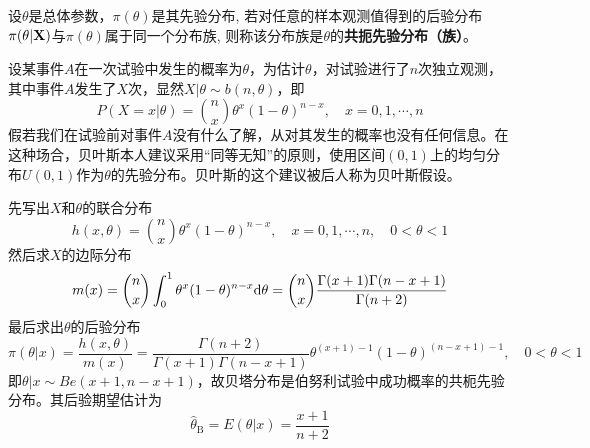 \begin{definition}[共扼先验分布]
    设$\theta$是总体参数，$\pi(\theta)$是其先验分布, 若对任意的样本观测值得到的后验分布$\pi(\theta|\bf{X})$与$\pi(\theta)$属于同一个分布族, 则称该分布族是$\theta$的\textbf{共扼先验分布（族）}。
\end{definition}

\begin{example}
    设某事件$A$在一次试验中发生的概率为$\theta$，为估计$\theta$，对试验进行了$n$次独立观测，其中事件$A$发生了$X$次，显然$X | \theta \sim b(n, \theta)$，即
    \[P(X=x | \theta)=\binom{n}{x} \theta^{x}(1-\theta)^{n-x}, \quad x=0,1, \cdots, n\]
    假若我们在试验前对事件$A$没有什么了解，从对其发生的概率也没有任何信息。在这种场合，贝叶斯本人建议采用“同等无知”的原则，使用区间$(0,1)$上的均匀分布$U(0,1)$作为$\theta$的先验分布。贝叶斯的这个建议被后人称为贝叶斯假设。
\end{example}
\begin{solution}
    先写出$X$和$\theta$的联合分布
    \[ h(x, \theta)=\binom{n}{x} \theta^x (1-\theta)^{n-x}, \quad x=0,1, \cdots, n, \quad 0<\theta<1\]
    然后求$X$的边际分布
    \[ m(x)=\binom{n}{x} \int_0^1 \theta^x (1-\theta)^{n - x} \mathrm{d} \theta=\binom{n}{x} \frac{\Gamma(x+1) \Gamma(n-x+1)}{\Gamma(n+2)}\]
    最后求出$\theta$的后验分布
    \[ \pi(\theta | x) =\frac{h(x, \theta)}{m(x)} =\frac{\Gamma(n+2)}{\Gamma(x+1) \Gamma(n-x+1)} \theta^{(x+1)-1}(1-\theta)^{(n-x+1)-1}, \quad 0<\theta<1  \]
    即$\theta | x \sim B e(x+1, n-x+1)$，故贝塔分布是伯努利试验中成功概率的共枙先验分布。其后验期望估计为
    \[ \hat{\theta}_{\mathrm{B}}=E(\theta | x)=\frac{x+1}{n+2} \]
\end{solution}

